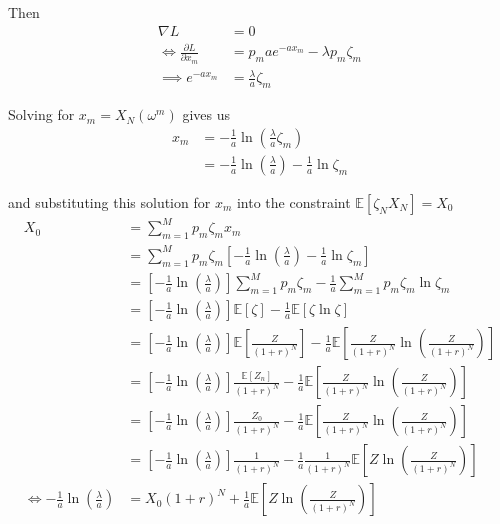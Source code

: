 \documentclass[12pt]{article}
\newcommand{\E}{\mathbb E}
\begin{document}
Then
\begin{align*}
	\nabla L &= 0 \\
	\iff \frac{ \partial L }{ \partial x_m } &= p_mae^{-ax_m} - \lambda p_m\zeta_m \\
	\implies e^{-ax_m} &= \frac{\lambda}{a}\zeta_m 
\end{align*}

Solving for $x_m = X_N(\omega^m)$ gives us
\begin{align*}
	x_m &= -\frac{1}{a}\ln \left( \frac{\lambda}{a}\zeta_m \right) \\
	&= -\frac{1}{a} \ln \left( \frac{\lambda}{a} \right) - \frac{1}{a} \ln \zeta_m
\end{align*}

and substituting this solution for $x_m$ into the constraint $\E[\zeta_N X_N] = X_0$
\begin{align*}
	X_0 &= \sum^M_{m = 1} p_m\zeta_mx_m \\
	&= \sum^M_{m = 1} p_m \zeta_m \left[ -\frac{1}{a} \ln \left( \frac{\lambda}{a} \right) - \frac{1}{a} \ln \zeta_m \right] \\
	&= \left[-\frac{1}{a}\ln \left( \frac{\lambda}{a} \right) \right] \sum^M_{m = 1} p_m\zeta_m - \frac{1}{a} \sum^M_{m = 1} p_m\zeta_m \ln \zeta_m \\
	&= \left[-\frac{1}{a}\ln \left( \frac{\lambda}{a} \right) \right] \E[\zeta] - \frac{1}{a} \E[\zeta\ln\zeta] \\
	&= \left[-\frac{1}{a}\ln \left( \frac{\lambda}{a} \right) \right] \E \left[ \frac{Z}{(1 + r)^N} \right] - \frac{1}{a} \E \left[ \frac{Z}{(1 + r)^N} \ln \left(\frac{Z}{(1 + r)^N}\right) \right] \\
	&= \left[-\frac{1}{a}\ln \left( \frac{\lambda}{a} \right) \right] \frac{ \E[Z_n] }{(1 + r)^N} - \frac{1}{a} \E \left[ \frac{Z}{(1 + r)^N} \ln \left(\frac{Z}{(1 + r)^N}\right) \right] \\
	&= \left[-\frac{1}{a}\ln \left( \frac{\lambda}{a} \right) \right] \frac{ Z_0 }{(1 + r)^N} - \frac{1}{a} \E \left[ \frac{Z}{(1 + r)^N} \ln \left(\frac{Z}{(1 + r)^N}\right) \right] \\
	&= \left[-\frac{1}{a}\ln \left( \frac{\lambda}{a} \right) \right] \frac{ 1 }{(1 + r)^N} - \frac{1}{a}\frac{1}{(1 + r)^N} \E \left[ Z \ln \left(\frac{Z}{(1 + r)^N}\right) \right] \\
	\iff -\frac{1}{a}\ln \left( \frac{\lambda}{a} \right) &= X_0(1 + r)^N + \frac{1}{a} \E \left[ Z \ln \left( \frac{Z}{(1 + r)^N} \right) \right]
\end{align*}
\end{document}
